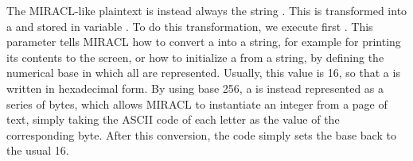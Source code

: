 \documentclass{article}
\begin{document}
The MIRACL-like plaintext is instead always the string . This is transformed into a \cBig and stored in variable . To do this transformation, we execute first . This parameter tells MIRACL how to convert a \cBig into a string, for example for printing its contents to the screen, or how to initialize a \cBig from a string, by defining the numerical base in which all \cBig are represented. Usually, this value is 16, so that a \cBig is written in hexadecimal form. By using base 256, a \cBig is instead represented as a series of bytes, which allows MIRACL to instantiate an integer from a page of text, simply taking the ASCII code of each letter as the value of the corresponding byte. 
After this conversion, the code simply sets the base back to the usual 16.

\subsection{}

\end{document}
